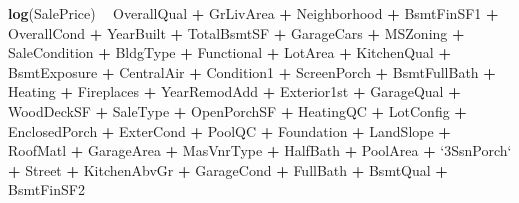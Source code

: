 \documentclass[american,]{article}
\newenvironment{Shaded}{\begin{snugshade}}{\end{snugshade}}
\newcommand{\DataTypeTok}[1]{\textcolor[rgb]{0.13,0.29,0.53}{#1}}
\newcommand{\KeywordTok}[1]{\textcolor[rgb]{0.13,0.29,0.53}{\textbf{#1}}}
\newcommand{\NormalTok}[1]{#1}
\newcommand{\OperatorTok}[1]{\textcolor[rgb]{0.81,0.36,0.00}{\textbf{#1}}}
\newcommand{\StringTok}[1]{\textcolor[rgb]{0.31,0.60,0.02}{#1}}
\begin{document}
\begin{Shaded}
\begin{Highlighting}[]
\KeywordTok{log}\NormalTok{(SalePrice) }\OperatorTok{~}\StringTok{ }
\StringTok{              }\NormalTok{OverallQual }\OperatorTok{+}\StringTok{ }\NormalTok{GrLivArea }\OperatorTok{+}\StringTok{ }\NormalTok{Neighborhood }\OperatorTok{+}\StringTok{ }\NormalTok{BsmtFinSF1 }\OperatorTok{+}
\StringTok{              }\NormalTok{OverallCond }\OperatorTok{+}\StringTok{ }\NormalTok{YearBuilt }\OperatorTok{+}\StringTok{ }\NormalTok{TotalBsmtSF }\OperatorTok{+}\StringTok{ }\NormalTok{GarageCars }\OperatorTok{+}\StringTok{ }\NormalTok{MSZoning }\OperatorTok{+}
\StringTok{              }\NormalTok{SaleCondition }\OperatorTok{+}\StringTok{ }\NormalTok{BldgType }\OperatorTok{+}\StringTok{ }\NormalTok{Functional }\OperatorTok{+}\StringTok{ }\NormalTok{LotArea }\OperatorTok{+}\StringTok{ }\NormalTok{KitchenQual }\OperatorTok{+}
\StringTok{              }\NormalTok{BsmtExposure }\OperatorTok{+}\StringTok{ }\NormalTok{CentralAir }\OperatorTok{+}\StringTok{ }\NormalTok{Condition1 }\OperatorTok{+}\StringTok{ }\NormalTok{ScreenPorch }\OperatorTok{+}\StringTok{ }\NormalTok{BsmtFullBath }\OperatorTok{+}
\StringTok{              }\NormalTok{Heating }\OperatorTok{+}\StringTok{ }\NormalTok{Fireplaces }\OperatorTok{+}\StringTok{ }\NormalTok{YearRemodAdd }\OperatorTok{+}\StringTok{ }\NormalTok{Exterior1st }\OperatorTok{+}\StringTok{ }\NormalTok{GarageQual }\OperatorTok{+}
\StringTok{              }\NormalTok{WoodDeckSF }\OperatorTok{+}\StringTok{ }\NormalTok{SaleType }\OperatorTok{+}\StringTok{ }\NormalTok{OpenPorchSF }\OperatorTok{+}\StringTok{ }\NormalTok{HeatingQC }\OperatorTok{+}\StringTok{ }\NormalTok{LotConfig }\OperatorTok{+}
\StringTok{              }\NormalTok{EnclosedPorch }\OperatorTok{+}\StringTok{ }\NormalTok{ExterCond }\OperatorTok{+}\StringTok{ }\NormalTok{PoolQC }\OperatorTok{+}\StringTok{ }\NormalTok{Foundation }\OperatorTok{+}\StringTok{ }\NormalTok{LandSlope }\OperatorTok{+}
\StringTok{              }\NormalTok{RoofMatl }\OperatorTok{+}\StringTok{ }\NormalTok{GarageArea }\OperatorTok{+}\StringTok{ }\NormalTok{MasVnrType }\OperatorTok{+}\StringTok{ }\NormalTok{HalfBath }\OperatorTok{+}\StringTok{ }\NormalTok{PoolArea }\OperatorTok{+}
\StringTok{              `}\DataTypeTok{3SsnPorch}\StringTok{`} \OperatorTok{+}\StringTok{ }\NormalTok{Street }\OperatorTok{+}\StringTok{ }\NormalTok{KitchenAbvGr }\OperatorTok{+}\StringTok{ }\NormalTok{GarageCond }\OperatorTok{+}\StringTok{ }\NormalTok{FullBath }\OperatorTok{+}
\StringTok{              }\NormalTok{BsmtQual }\OperatorTok{+}\StringTok{ }\NormalTok{BsmtFinSF2}
\end{Highlighting}
\end{Shaded}
\end{document}
